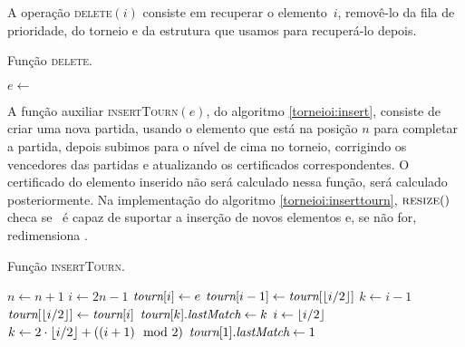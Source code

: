 A operação \textsc{delete}$(i)$ consiste em recuperar o
elemento~$i$, removê-lo da fila de prioridade, do torneio e da
estrutura que usamos para recuperá-lo depois.
\begin{algorithm}
\caption{Função \textsc{delete}.} \label{torneioi:delete}
\begin{algorithmic}[1]
        \State $e \leftarrow$ 
        \State {}
        \State {}
        \State {}
    \EndFunction
\end{algorithmic}
\end{algorithm}

A função auxiliar \textsc{insertTourn}$(e)$, do
algoritmo \ref{torneioi:insert}, consiste de criar uma
nova partida, usando o elemento que está na posição $n$ para
completar a partida, depois subimos para o nível de cima no
torneio, corrigindo os vencedores das partidas e atualizando os
certificados correspondentes. O certificado do elemento inserido
não será calculado nessa função, será calculado posteriormente. Na
implementação do algoritmo \ref{torneioi:inserttourn},
$\textsc{resize}()$ checa se \torneio~é capaz de suportar a
inserção de novos elementos e, se não for, redimensiona \torneio.
\begin{algorithm}
\caption{Função \textsc{insertTourn}.} \label{torneioi:inserttourn}
\begin{algorithmic}[1]
        \State {}
        \State $n \leftarrow n + 1$
        \State $i \leftarrow 2n - 1$
        \State $\textit{tourn}[i] \leftarrow e$
        \State $\textit{tourn}[i - 1] \leftarrow \textit{tourn}[\left\lfloor i/2 \right\rfloor]$
        \State $k \leftarrow i - 1$
            \State $\textit{tourn}[\left\lfloor i/2 \right\rfloor] \leftarrow \textit{tourn}[i]$
            \State $\textit{tourn}[k].\textit{lastMatch} \leftarrow k$
            \State {}
            \State $i \leftarrow \left\lfloor i/2 \right\rfloor$
            \State $k \leftarrow 2\cdot \left\lfloor i/2 \right\rfloor +
            ((i + 1)\mod2)$ 
        \EndWhile
        \State $\textit{tourn}[1].\textit{lastMatch} \leftarrow 1$
    \EndFunction
\end{algorithmic}
\end{algorithm}
